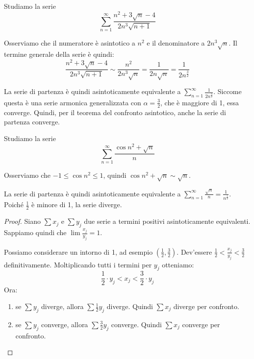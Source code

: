 \begin{example}
Studiamo la serie 
\begin{equation*}
\sum_{n=1}^\infty \frac{n^2 + 3\sqrt{n}-4}{2n^3\sqrt{n+1}}
\end{equation*}

Osserviamo che il numeratore è asintotico a $n^2$ e il denominatore a $2n^3\sqrt{n}$. Il termine generale della serie è quindi:
\begin{equation*}
\frac{n^2 + 3\sqrt{n}-4}{2n^3\sqrt{n+1}} \sim \frac{n^2}{2n^3\sqrt{n}} = \frac{1}{2n\sqrt{n}} = \frac{1}{2n^{\frac{3}{2}}}
\end{equation*}

La serie di partenza è quindi asintoticamente equivalente a $\sum_{n=1}^\infty \frac{1}{2n^{\frac{3}{2}}}$. Siccome questa è una serie armonica generalizzata con $\alpha = \frac{3}{2}$, che è maggiore di 1, essa converge. Quindi, per il teorema del confronto asintotico, anche la serie di partenza converge.
\end{example}

\begin{example}
Studiamo la serie 
\begin{equation*}
\sum_{n=1}^\infty \frac{\cos n^2 + \sqrt{n}}{n}
\end{equation*}

Osserviamo che $-1 \le \cos n^2 \le 1$, quindi $\cos n^2 + \sqrt{n} \sim \sqrt{n}$.

La serie di partenza è quindi asintoticamente equivalente a $\sum_{n=1}^\infty \frac{\sqrt{n}}{n} = \frac{1}{n^\frac{1}{2}}$. Poiché $\frac{1}{2}$ è minore di 1, la serie diverge.
\end{example}

\begin{proof}
Siano $\sum x_j$ e $\sum y_j$ due serie a termini positivi asintoticamente equivalenti. Sappiamo quindi che $\lim \frac{x_j}{y_j} = 1$.

Possiamo considerare un intorno di 1, ad esempio $(\frac{1}{2}, \frac{3}{2})$. Dev'essere $\frac{1}{2} < \frac{x_j}{y_j} < \frac{3}{2}$ definitivamente. Moltiplicando tutti i termini per $y_j$ otteniamo:
\begin{equation*}
\frac{1}{2} \cdot y_j < x_j < \frac{3}{2} \cdot y_j
\end{equation*}
Ora:
\begin{enumerate}
\item se $\sum y_j$ diverge, allora $\sum \frac{1}{2} y_j$ diverge. Quindi $\sum x_j$ diverge per confronto.
\item se $\sum y_j$ converge, allora $\sum \frac{3}{2} y_j$ converge. Quindi $\sum x_j$ converge per confronto.
\end{enumerate}
\end{proof}

